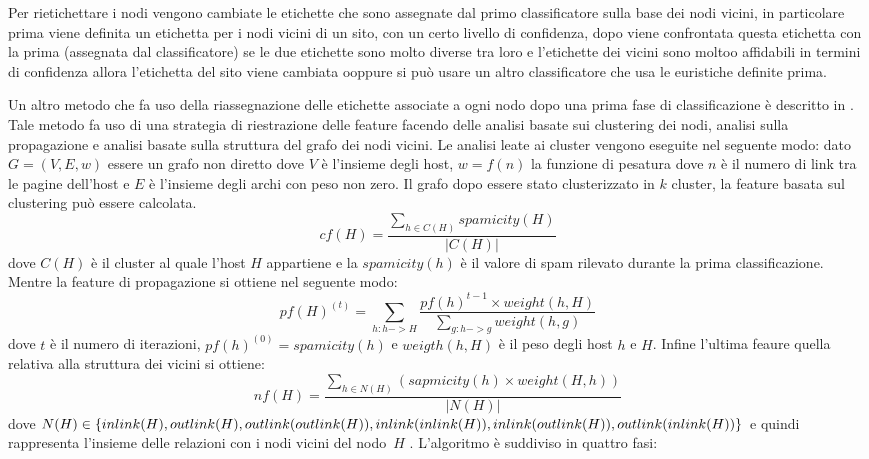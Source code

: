 Per rietichettare i nodi vengono cambiate le etichette che sono assegnate dal primo classificatore  sulla base dei nodi vicini, in particolare
prima viene definita un etichetta per i nodi vicini di un sito, con un certo livello di confidenza, dopo viene confrontata questa etichetta con la prima (assegnata dal classificatore) se le due etichette sono molto diverse tra loro e l'etichette dei vicini sono moltoo affidabili in termini di confidenza 
allora l’etichetta del sito viene cambiata ooppure si può usare un altro classificatore che usa le euristiche definite prima.

Un altro metodo che fa uso della riassegnazione delle etichette associate a ogni nodo dopo una prima fase di classificazione è descritto in \cite{Geng:2008:IWS:1367497.1367685}. Tale metodo fa uso di una strategia di riestrazione delle feature facendo delle analisi basate sui clustering dei nodi, analisi sulla propagazione e analisi basate sulla struttura del grafo dei nodi vicini. 
Le analisi leate ai cluster vengono eseguite nel seguente modo: dato \(G=(V,E,w)\) essere un grafo non diretto dove \(V\) è l'insieme degli host, \(w=f(n)\) la funzione di pesatura dove \(n\) è il numero di link tra le pagine dell'host e \(E\) è l'insieme degli archi con peso non zero. Il grafo dopo essere stato clusterizzato in \(k\) cluster, la feature basata sul clustering può essere calcolata.
\begin{equation}
 cf(H)=\frac{\sum_{h\in C(H)}spamicity(H)}{|C(H)|}
\end{equation}
dove \(C(H)\) è il cluster al quale l'host \(H\) appartiene e la \(spamicity(h)\) è il valore di spam rilevato durante la prima classificazione. Mentre la feature di propagazione si ottiene nel seguente modo:
\begin{equation}
 pf(H)^{(t)}=\sum_{h:h->H}\frac{pf(h)^{t-1}\times weight(h,H)}{\sum_{g:h->g}weight(h,g)}
\end{equation}
dove \(t\) è il numero di iterazioni, \(pf(h)^{(0)}=spamicity(h)\) e \(weigth(h,H)\) è il peso degli host \(h\) e \(H\). Infine l'ultima feaure quella relativa alla struttura dei vicini si ottiene:
\begin{equation}
 nf(H)=\frac{\sum_{h\in N(H)}(sapmicity(h)\times weight(H,h))}{|N(H)|}
\end{equation}
dove \(N(H) \in \{inlink(H), outlink(H), outlink(outlink(H)), inlink(inlink(H)),\\ inlink(outlink(H)), outlink(inlink(H))\}\) e quindi rappresenta l'insieme delle relazioni con i nodi vicini del nodo\ \(H\) . L'algoritmo è suddiviso in quattro fasi:
